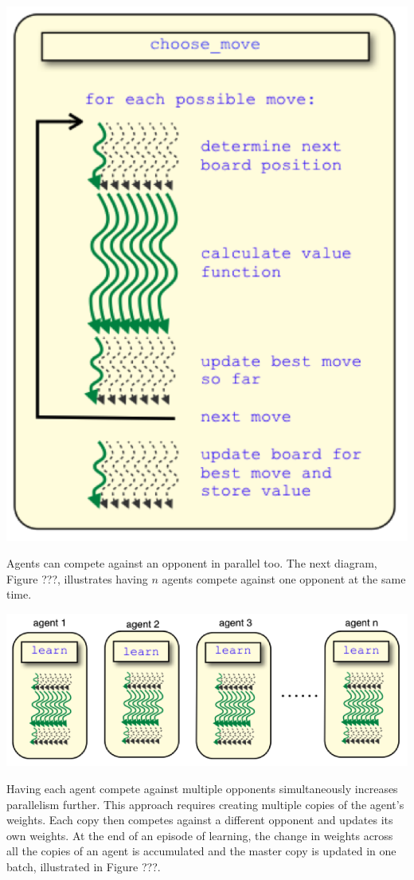 \center
\includegraphics[scale=0.8]{fig14}
\begin{flushleft}


Agents can compete against an opponent in parallel too.  The next diagram, Figure ???, illustrates having $n$ agents compete against one opponent at the same time.

\end{flushleft}
\center
\includegraphics[scale=0.8]{fig15}
\begin{flushleft}

Having each agent compete against multiple opponents simultaneously increases parallelism further.  This approach requires creating multiple copies of the agent’s weights.  Each copy then competes against a different opponent and updates its own weights.  At the end of an episode of learning, the change in weights across all the copies of an agent is accumulated and the master copy is updated in one batch, illustrated in Figure ???.

\end{flushleft}
